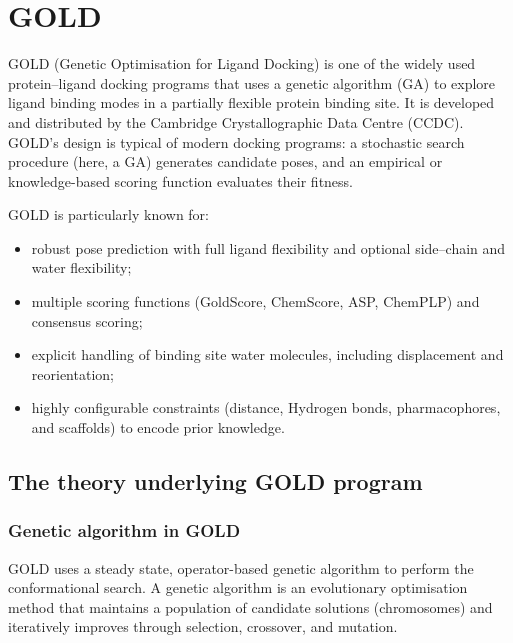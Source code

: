 \documentclass[12pt, a4paper]{article}
\begin{document}
\section{GOLD}

GOLD (Genetic Optimisation for Ligand Docking) is one of the widely used protein--ligand docking programs that uses a genetic algorithm (GA) to explore ligand binding modes in a partially flexible protein binding site.\cite{CH7_Jones1997} It is developed and distributed by the Cambridge Crystallographic Data Centre (CCDC). GOLD's design is typical of modern docking programs: a stochastic search procedure (here, a GA) generates candidate poses, and an empirical or knowledge-based scoring function evaluates their fitness.\cite{CH7_Jones1997}

GOLD is particularly known for:

\begin{itemize}
    \item robust pose prediction with full ligand flexibility and optional side–chain and water flexibility;
    \item multiple scoring functions (GoldScore, ChemScore, ASP, ChemPLP) and consensus scoring;\cite{CH7_Verdonk2003,CH7_Mooij2005}
    \item explicit handling of binding site water molecules, including displacement and reorientation;
    \item highly configurable constraints (distance, Hydrogen bonds, pharmacophores, and scaffolds) to encode prior knowledge.
\end{itemize}

\subsection{The theory underlying GOLD program}

\subsubsection{Genetic algorithm in GOLD}

GOLD uses a steady state, operator-based genetic algorithm to perform the conformational search.\cite{CH7_Jones1997} A genetic algorithm is an evolutionary optimisation method that maintains a population of candidate solutions (chromosomes) and iteratively improves through selection, crossover, and mutation.
\end{document}
